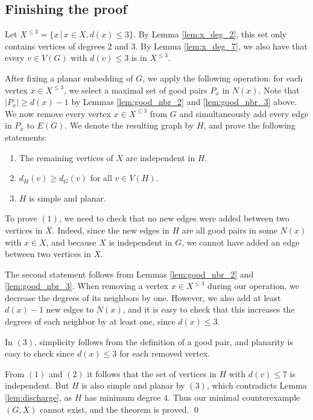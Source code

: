 \documentclass[a4paper, 12pt]{article}
\begin{document}
\subsection{Finishing the proof}

Let $X^{\leq3} = \{x\, \vert \, x\in X, d(x) \leq 3\}$. By Lemma \ref{lem:x_deg_2}, this set only contains vertices of degrees $2$ and $3$. By Lemma \ref{lem:x_deg_7}, we also have that every $v\in V(G)$ with $d(v) \leq 3$ is in $X^{\leq3}$.


After fixing a planar embedding of $G$, we apply the following operation:
for each vertex $x \in X^{\leq3}$, we select a maximal set of good pairs $P_x$ in $N(x)$. Note that $\vert P_x\vert \geq d(x)-1$ by Lemmas \ref{lem:good_nbr_2} and \ref{lem:good_nbr_3} above.
We now remove every vertex $x \in X^{\leq3}$ from $G$ and simultaneously add every edge in $P_x$ to $E(G)$. We denote the resulting graph by $H$, and prove the following statements:

\begin{enumerate}[label=(\arabic*)]
    \item The remaining vertices of $X$ are independent in $H$.
    \item $d_H(v) \geq d_G(v)$ for all $v \in V(H)$.
    \item $H$ is simple and planar.
\end{enumerate}

To prove $(1)$, we need to check that no new edges were added between two vertices in $X$. Indeed, since the new edges in $H$ are all good pairs in some $N(x)$ with $x \in X$, and because $X$ is independent in $G$, we cannot have added an edge between two vertices in $X$.

The second statement follows from Lemmas \ref{lem:good_nbr_2} and \ref{lem:good_nbr_3}. When removing a vertex $x \in X^{\leq3}$ during our operation, we decrease the degrees of its neighbors by one. However, we also add at least $d(x)-1$ new edges to $N(x)$, and it is easy to check that this increases the degrees of each neighbor by at least one, since $d(x) \leq 3$.

In $(3)$, simplicity follows from the definition of a good pair, and planarity is easy to check since $d(x) \leq 3$ for each removed vertex.

From $(1)$ and $(2)$ it follows that the set of vertices in $H$ with $d(v) \leq 7$ is independent. But $H$ is also simple and planar by $(3)$, which contradicts Lemma \ref{lem:discharge}, as $H$ has minimum degree $4$. Thus our minimal counterexample $(G, X)$ cannot exist, and the theorem is proved. \qed
\end{document}
